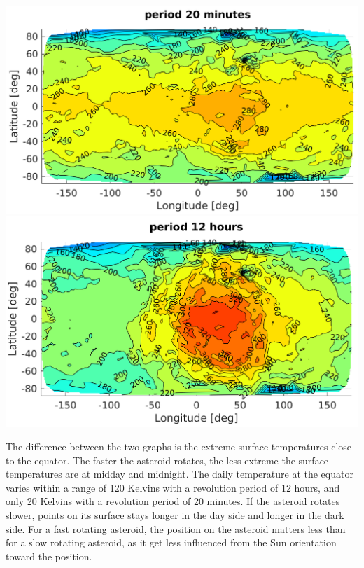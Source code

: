 \begin{center}
    \includegraphics[width=\linewidth]{rsc/theo20mn.png}
    \includegraphics[width=\linewidth]{rsc/theo12h.png}
    \label{fig:7.2}
\end{center}

The difference between the two graphs is the extreme surface temperatures close to the equator. The faster the asteroid rotates, the less extreme the surface temperatures are at midday and midnight. The daily temperature at the equator varies within a range of 120 Kelvins with a revolution period of 12 hours, and only 20 Kelvins with a revolution period of 20 minutes. If the asteroid rotates slower, points on its surface stays longer in the day side and longer in the dark side. For a fast rotating asteroid, the position on the asteroid matters less than for a slow rotating asteroid, as it get less influenced from the Sun orientation toward the position.

